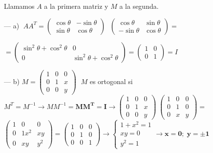 \begin{proofw}\renewcommand{\qedsymbol}{$\diamond$} Llamamos $A$ a la primera matriz y $M$ a la segunda.

	\noindent --- a) $\; AA^T=
	\left( \begin{array}{cc} \cos \theta & -\sin \theta \\ \sin \theta & \cos \theta   \end{array} \right) \; $
	$\left( \begin{array}{cc} \cos \theta & \sin \theta \\ -\sin \theta & \cos \theta   \end{array} \right) =$
	
	\noindent $=\left( \begin{array}{cc} \sin^2 \theta + \cos^2 \theta & 0 \\ 0 & \sin^2 \theta + \cos^2 \theta  \end{array} \right) =\left( \begin{array}{cc} 1 & 0 \\ 0 & 1   \end{array} \right)=I$
	
\noindent --- b) $M=\left( \begin{array}{ccc}   1&0&0 \\ 0&1&x \\0&0&y  \end{array} \right)\;$ $M$ es ortogonal si $M^T=M^{-1} \to MM^{-1}=\boldsymbol{MM^T=I} \to 
\left( \begin{array}{ccc}   1&0&0 \\ 0&1&x \\0&0&y  \end{array} \right) \;
\left( \begin{array}{ccc}   1&0&0 \\ 0&1&0 \\0&x&y  \end{array} \right)=$ 
$\left( \begin{array}{ccc}   1&0&0 \\ 0&1x^2&xy \\0&xy&y^2  \end{array} \right)=\left( \begin{array}{ccc}   1&0&0 \\ 0&1&0 \\0&0&1  \end{array} \right) \to \begin{cases} 1+x^2=1\\xy=0\\y^2=1  \end{cases} \to \boldsymbol {x=0; \; y=\pm 1}$
\end{proofw}

